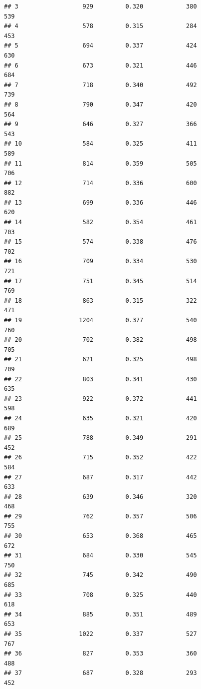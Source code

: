 \documentclass[]{book}
\begin{document}
\begin{verbatim}
## 3                  929         0.320            380                 539
## 4                  578         0.315            284                 453
## 5                  694         0.337            424                 630
## 6                  673         0.321            446                 684
## 7                  718         0.340            492                 739
## 8                  790         0.347            420                 564
## 9                  646         0.327            366                 543
## 10                 584         0.325            411                 589
## 11                 814         0.359            505                 706
## 12                 714         0.336            600                 882
## 13                 699         0.336            446                 620
## 14                 582         0.354            461                 703
## 15                 574         0.338            476                 702
## 16                 709         0.334            530                 721
## 17                 751         0.345            514                 769
## 18                 863         0.315            322                 471
## 19                1204         0.377            540                 760
## 20                 702         0.382            498                 705
## 21                 621         0.325            498                 709
## 22                 803         0.341            430                 635
## 23                 922         0.372            441                 598
## 24                 635         0.321            420                 689
## 25                 788         0.349            291                 452
## 26                 715         0.352            422                 584
## 27                 687         0.317            442                 633
## 28                 639         0.346            320                 468
## 29                 762         0.357            506                 755
## 30                 653         0.368            465                 672
## 31                 684         0.330            545                 750
## 32                 745         0.342            490                 685
## 33                 708         0.325            440                 618
## 34                 885         0.351            489                 653
## 35                1022         0.337            527                 767
## 36                 827         0.353            360                 488
## 37                 687         0.328            293                 452

\end{verbatim}
\end{document}
